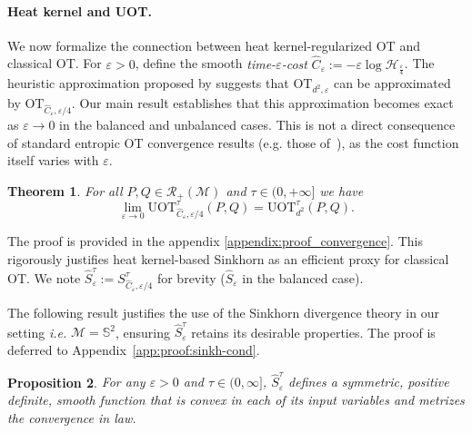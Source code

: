 \documentclass{article}
\theoremstyle{plain}
\newtheorem{theorem}{Theorem}[section]
\newtheorem{proposition}[theorem]{Proposition}
\theoremstyle{definition}
\theoremstyle{remark}
\newcommand{\il}[1]{{\color{red}{IL: }{#1}}}
\renewcommand{\S}{\ensuremath{\mathbb{S}}}
\newcommand{\M}{\ensuremath{\mathcal{M}}}
\begin{document}
\paragraph{Heat kernel and UOT.}
We now formalize the connection between heat kernel-regularized OT and classical OT. For $\varepsilon > 0$, define the smooth \emph{time-$\varepsilon$-cost} $\widehat C_\varepsilon  := -\varepsilon \log \mathcal{H}_{\frac{\varepsilon}{4}}$.
The heuristic approximation proposed by \cite{solomon2015convolutional} suggests that $\mathrm{OT}_{d^2,\varepsilon}$ can be approximated by $\mathrm{OT}_{\widehat C_\varepsilon, \varepsilon/4}$. Our main result establishes that this approximation becomes exact as $\varepsilon \to 0$ in the balanced and unbalanced cases. This is not a direct consequence of standard entropic OT convergence results (e.g. those of~\cite{carlier2017convergence, nutz2021introduction, carlier2023convergence}), as the cost function itself varies with $\varepsilon$.

\begin{theorem}\label{thm:conv-heat-reg}
	For all $P, Q \in \mathcal{R}_{+}(\M)$ and $\tau \in (0, +\infty]$ we have
	\[ \lim_{\varepsilon \to 0} \mathrm{UOT}_{\widehat C_\varepsilon, \varepsilon/4}^{\tau}(P,Q) = \mathrm{UOT}_{d^2}^{\tau}(P,Q). \]
\end{theorem}
The proof is provided in the appendix \ref{appendix:proof_convergence}. This rigorously justifies heat kernel-based Sinkhorn as an efficient proxy for classical OT.
We note $\hat{S}^\tau_\varepsilon := S^\tau_{\widehat C_{\varepsilon},\varepsilon/4}$ for brevity ($\hat{S}_\varepsilon$ in the balanced case).


The following result justifies the use of the Sinkhorn divergence theory in our setting \textit{i.e.} $\M=\S^{2}$, ensuring $\hat{S}^\tau_\varepsilon$ retains its desirable properties.
The proof is deferred to Appendix~\ref{app:proof:sinkh-cond}. 

\begin{proposition}\label{prop:sinkh:cond}
For any $\varepsilon > 0$ and $\tau \in (0, \infty]$, $\hat{S}^\tau_\varepsilon$ defines a symmetric, positive definite, smooth function that is convex in each of its input variables and metrizes the convergence in law.
\end{proposition}
\end{document}
